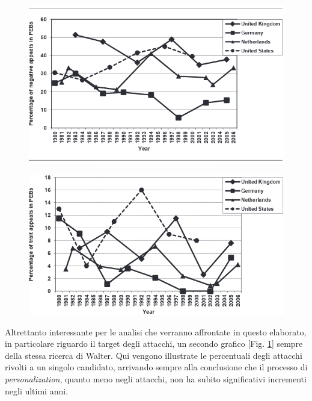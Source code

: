 \begin{figure}
	\centering
	\begin{minipage}{.5\textwidth}
		\centering
		\includegraphics[width=0.99\linewidth]{figures/negativa22}
		\label{fig:negativab}
	\end{minipage}%
	\begin{minipage}{.5\textwidth}
		\centering
		\includegraphics[width=1\linewidth]{figures/trait}
		\label{fig:trait}
	\end{minipage}
\end{figure}

Altrettanto interessante per le analisi che verranno affrontate in questo elaborato, in particolare riguardo il target degli attacchi, un secondo grafico [Fig. \ref{fig:trait}] sempre della stessa ricerca di Walter\citep{walter2014}. Qui vengono illustrate le percentuali degli attacchi rivolti a un singolo candidato, arrivando sempre alla conclusione che il processo di \textit{personalization}, quanto meno negli attacchi, non ha subito significativi incrementi negli ultimi anni.

